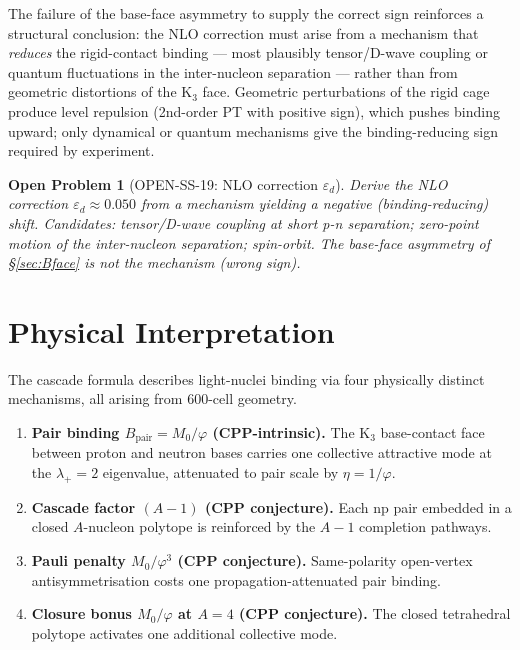 \documentclass[11pt,letterpaper]{article}
\newtheorem{openproblem}{Open Problem}
\newcommand{\phig}{\varphi}
\newcommand{\Mzero}{M_0}
\newcommand{\Bpair}{B_{\mathrm{pair}}}
\newcommand{\epsd}{\varepsilon_{d}}
\begin{document}
The failure of the base-face asymmetry to supply the correct sign reinforces a structural conclusion: the NLO correction must arise from a mechanism that \emph{reduces} the rigid-contact binding --- most plausibly tensor/D-wave coupling or quantum fluctuations in the inter-nucleon separation --- rather than from geometric distortions of the K$_3$ face. Geometric perturbations of the rigid cage produce level repulsion (2nd-order PT with positive sign), which pushes binding upward; only dynamical or quantum mechanisms give the binding-reducing sign required by experiment.

\begin{openproblem}[OPEN-SS-19: NLO correction $\epsd$]
Derive the NLO correction $\epsd \approx 0.050$ from a mechanism yielding a negative (binding-reducing) shift. Candidates: tensor/D-wave coupling at short p-n separation; zero-point motion of the inter-nucleon separation; spin-orbit. The base-face asymmetry of §\ref{sec:Bface} is not the mechanism (wrong sign).
\end{openproblem}

\section{Physical Interpretation}
\label{sec:interpretation}

The cascade formula describes light-nuclei binding via four physically distinct mechanisms, all arising from 600-cell geometry.

\begin{enumerate}
\item \textbf{Pair binding $\Bpair = \Mzero/\phig$ (CPP-intrinsic).} The K$_3$ base-contact face between proton and neutron bases carries one collective attractive mode at the $\lambda_+ = 2$ eigenvalue, attenuated to pair scale by $\eta = 1/\phig$.
\item \textbf{Cascade factor $(A-1)$ (CPP conjecture).} Each np pair embedded in a closed $A$-nucleon polytope is reinforced by the $A-1$ completion pathways.
\item \textbf{Pauli penalty $\Mzero/\phig^3$ (CPP conjecture).} Same-polarity open-vertex antisymmetrisation costs one propagation-attenuated pair binding.
\item \textbf{Closure bonus $\Mzero/\phig$ at $A=4$ (CPP conjecture).} The closed tetrahedral polytope activates one additional collective mode.
\end{enumerate}
\end{document}
